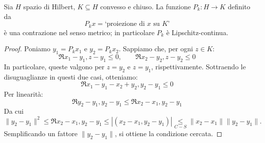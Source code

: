 \begin{lemma}
\label{lemma:hilb_seven}
	Sia $H$ spazio di Hilbert, $K \subseteq H$ convesso e chiuso.
	La funzione $P_k : H \to K$ definito da
	\begin{equation*}
		P_kx = \text{`proiezione di $x$ su $K$'}
	\end{equation*}
	è una contrazione nel senso metrico; in particolare $P_k$ è Lipschitz-continua.
\end{lemma}
\begin{proof}
	Poniamo $y_1 = P_kx_1$ e $y_2 = P_k x_2$. Sappiamo che, per ogni $z \in K$:
	\begin{equation*}
		\Re{x_1 -y_1, z-y_1} \leq 0, \qquad \Re{x_2 -y_2, z-y_2} \leq 0
	\end{equation*}
	In particolare, queste valgono per $z=y_2$ e $z=y_1$, rispettivamente.
	Sottraendo le disuguaglianze in questi due casi, otteniamo:
	\begin{equation*}
		\Re{x_1-y_1-x_2+y_2, y_2-y_1} \leq 0
	\end{equation*}
	Per linearità:
	\begin{equation*}
		\Re{y_2-y_1, y_2-y_1} \leq \Re{x_2-x_1, y_2-y_1}
	\end{equation*}
	Da cui
	\begin{equation*}
		\|y_2-y_1\|^2 \leq \Re{x_2-x_1, y_2-y_1} \leq |(x_2-x_1, y_2-y_1)| \underset{C-S}\leq \|x_2-x_1\|\|y_2-y_1\|.
	\end{equation*}
	Semplificando un fattore $\|y_2-y_1\|$, si ottiene la condizione cercata.
\end{proof}

